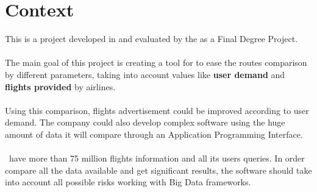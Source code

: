 
\chapter{Context}

\label{chapter01}

This is a project developed in \textit{\company} and evaluated by the \textit{\univname} as a Final Degree Project.
\\\\
The main goal of this project is creating a tool for \textit{\company} to ease the routes comparison by different parameters, taking into account values like \textbf{user demand} and \textbf{flights provided} by airlines.
\\\\
Using this comparison, flights advertisement could be improved according to user demand. The company could also develop complex software using the huge amount of data it will compare through an Application Programming Interface.
\\\\
\company\ have more than 75 million flights information and all its users queries. In order compare all the data available and get significant results, the software should take into account all possible risks working with Big Data frameworks.


\section{\company}


